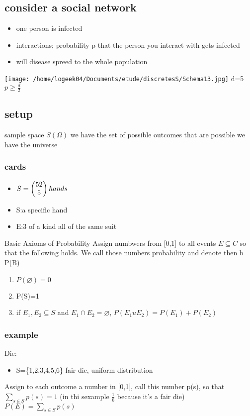 \documentclass[a4paper,10pt]{article}
\begin{document}
\subsection{consider a social network}
\begin{itemize}
 \item one person is infected
 \item interactions; probability p that the person you interact with gets infected
 \item will disease spreed to the whole population 
\end{itemize}
\texttt{[image: /home/logeek04/Documents/etude/discretesS/Schema13.jpg]}
d=5
\newline
$p\geq \frac{d}{2}$
\subsection{setup}
sample space $S(\Omega)$
\newline
we have the set of possible outcomes that are possible
\newline
we have the universe
\subsubsection{cards}
\begin{itemize}
 \item $S=\begin{pmatrix}
         52\cr
         5\cr
        \end{pmatrix}hands
$
\item S:a specific hand 
\item E:3 of a kind all of the same suit
\end{itemize}
Basic Axioms of Probability 
\newline
Assign numbwers from [0,1] to all events $E\subseteq C$ so that the following holds. We call those numbers probability and denote then b P(B)
\begin{enumerate}
 \item $P(\varnothing)=0$
 \item P(S)=1
 \item if $E_1,E_2\subseteq S$ and $E_1\cap E_2=\varnothing$, $P(E_1uE_2)=P(E_1)+P(E_2)$
\end{enumerate}
\subsubsection{example}
Die:
\begin{itemize}
 \item S=\{1,2,3,4,5,6\} fair die, uniform distribution
\end{itemize}
Assign to each outcome a number in [0,1], call this number p(s), so that $\sum_{s\in S} p(s)= 1$ (in thi sexample $\frac{1}{6}$ because it's a fair die)
\newline
$P(E)=\sum_{s\in S}p(s)$
\end{document}
